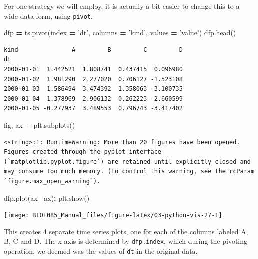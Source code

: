 \documentclass[
  letterpaper,
]{scrbook}
\newenvironment{Shaded}{\begin{snugshade}}{\end{snugshade}}
\newcommand{\NormalTok}[1]{#1}
\newcommand{\OperatorTok}[1]{\textcolor[rgb]{0.81,0.36,0.00}{\textbf{#1}}}
\newcommand{\StringTok}[1]{\textcolor[rgb]{0.31,0.60,0.02}{#1}}
\begin{document}
For one strategy we will employ, it is actually a bit easier to change this to a wide data form, using \texttt{pivot}.

\begin{Shaded}
\begin{Highlighting}[]
\NormalTok{dfp }\OperatorTok{=}\NormalTok{ ts.pivot(index }\OperatorTok{=} \StringTok{'dt'}\NormalTok{, columns }\OperatorTok{=} \StringTok{'kind'}\NormalTok{, values }\OperatorTok{=} \StringTok{'value'}\NormalTok{)}
\NormalTok{dfp.head()}
\end{Highlighting}
\end{Shaded}

\begin{verbatim}
kind               A         B         C         D
dt                                                
2000-01-01  1.442521  1.808741  0.437415  0.096980
2000-01-02  1.981290  2.277020  0.706127 -1.523108
2000-01-03  1.586494  3.474392  1.358063 -3.100735
2000-01-04  1.378969  2.906132  0.262223 -2.660599
2000-01-05 -0.277937  3.489553  0.796743 -3.417402
\end{verbatim}

\begin{Shaded}
\begin{Highlighting}[]
\NormalTok{fig, ax }\OperatorTok{=}\NormalTok{ plt.subplots()}
\end{Highlighting}
\end{Shaded}

\begin{verbatim}
<string>:1: RuntimeWarning: More than 20 figures have been opened. Figures created through the pyplot interface (`matplotlib.pyplot.figure`) are retained until explicitly closed and may consume too much memory. (To control this warning, see the rcParam `figure.max_open_warning`).
\end{verbatim}

\begin{Shaded}
\begin{Highlighting}[]
\NormalTok{dfp.plot(ax}\OperatorTok{=}\NormalTok{ax)}\OperatorTok{;}
\NormalTok{plt.show()}
\end{Highlighting}
\end{Shaded}

\begin{center}\texttt{[image: BIOF085\_Manual\_files/figure-latex/03-python-vis-27-1]} \end{center}

This creates 4 separate time series plots, one for each of the columns labeled A, B, C and D. The x-axis is determined by \texttt{dfp.index}, which during the pivoting operation, we deemed was the values of \texttt{dt} in the original data.
\end{document}
